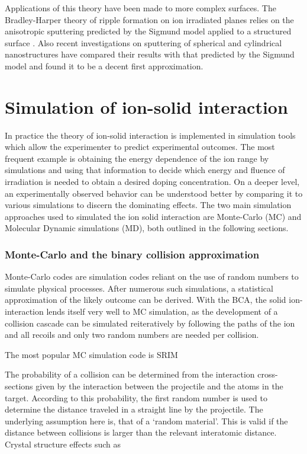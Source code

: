 Applications of this theory have been made to more complex surfaces. The Bradley-Harper theory of ripple formation on ion irradiated planes relies on the anisotropic sputtering predicted by the Sigmund model applied to a structured surface \cite{bradley_theory_1988}. Also recent investigations on sputtering of spherical \cite{nietiadi_sputtering_2014} and cylindrical \cite{urbassek_sputter_2015} nanostructures have compared their results with that predicted by the Sigmund model and found it to be a decent first approximation.

\section{Simulation of ion-solid interaction}

In practice the theory of ion-solid interaction is implemented in simulation tools which allow the experimenter to predict experimental outcomes. The most frequent example is obtaining the energy dependence of the ion range by simulations and using that information to decide which energy and fluence of irradiation is needed to obtain a desired doping concentration. On a deeper level, an experimentally observed behavior can be understood better by comparing it to various simulations to discern the dominating effects. The two main simulation approaches used to simulated the ion solid interaction are Monte-Carlo (MC) and Molecular Dynamic simulations (MD), both outlined in the following sections.


\subsubsection{Monte-Carlo and the binary collision approximation}

Monte-Carlo codes are simulation codes reliant on the use of random numbers to simulate physical processes. After numerous such simulations, a statistical approximation of the likely outcome can be derived. With the BCA, the solid ion-interaction lends itself very well to MC simulation, as the development of a collision cascade can be simulated reiteratively by following the paths of the ion and all recoils and only two random numbers are needed per collision.

 The most popular MC simulation code is SRIM

The probability of a collision can be determined from the interaction cross-sections given by the interaction between the projectile and the atoms in the target. According to this probability, the first random number is used to determine the distance traveled in a straight line by the projectile. The underlying assumption here is, that of a `random material'. This is valid if the distance between collisions is larger than the relevant interatomic distance. Crystal structure effects such as 

